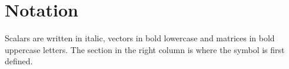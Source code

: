
\chapter*{Notation}
{}

Scalars are written in italic, vectors in bold lowercase and matrices in bold uppercase letters.
The section in the right column is where the symbol is first defined.

